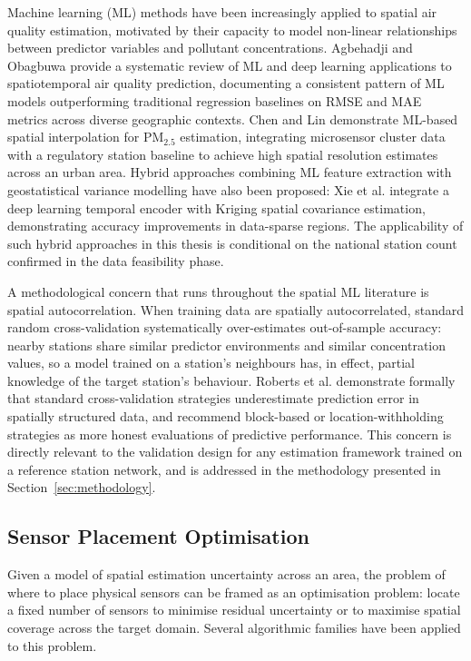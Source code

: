 \documentclass[11pt,a4paper]{article}
\let\oldsubsection\subsection
\renewcommand{\subsection}{\FloatBarrier\oldsubsection}
\begin{document}
Machine learning (ML) methods have been increasingly applied to spatial air quality estimation, motivated by their capacity to model non-linear relationships between predictor variables and pollutant concentrations. Agbehadji and Obagbuwa \cite{agbehadji_ml_aq_review_2024} provide a systematic review of ML and deep learning applications to spatiotemporal air quality prediction, documenting a consistent pattern of ML models outperforming traditional regression baselines on RMSE and MAE metrics across diverse geographic contexts. Chen and Lin \cite{chen_pm25_interpolation_2021} demonstrate ML-based spatial interpolation for PM$_{2.5}$ estimation, integrating microsensor cluster data with a regulatory station baseline to achieve high spatial resolution estimates across an urban area. Hybrid approaches combining ML feature extraction with geostatistical variance modelling have also been proposed: Xie et al. \cite{xie_swinlstm_kriging_2025} integrate a deep learning temporal encoder with Kriging spatial covariance estimation, demonstrating accuracy improvements in data-sparse regions. The applicability of such hybrid approaches in this thesis is conditional on the national station count confirmed in the data feasibility phase.

A methodological concern that runs throughout the spatial ML literature is spatial autocorrelation. When training data are spatially autocorrelated, standard random cross-validation systematically over-estimates out-of-sample accuracy: nearby stations share similar predictor environments and similar concentration values, so a model trained on a station's neighbours has, in effect, partial knowledge of the target station's behaviour. Roberts et al. \cite{roberts_spatial_cv_2017} demonstrate formally that standard cross-validation strategies underestimate prediction error in spatially structured data, and recommend block-based or location-withholding strategies as more honest evaluations of predictive performance. This concern is directly relevant to the validation design for any estimation framework trained on a reference station network, and is addressed in the methodology presented in Section~\ref{sec:methodology}.

\subsection{Sensor Placement Optimisation}
\label{sec:placement-opt-lit}

Given a model of spatial estimation uncertainty across an area, the problem of where to place physical sensors can be framed as an optimisation problem: locate a fixed number of sensors to minimise residual uncertainty or to maximise spatial coverage across the target domain. Several algorithmic families have been applied to this problem.
\end{document}
